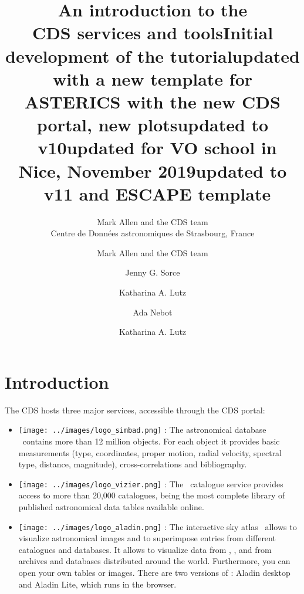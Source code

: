 \documentclass [a4paper, 12pt]{article}
\begin{document}
\author{Mark Allen and the CDS team \\      %
Centre de Donn\'ees astronomiques de Strasbourg, France}       %
\title{An introduction to the \\ CDS services and tools}   %
\makeescapetitle

\newpage
\author{Mark Allen and the CDS team}   %
\title{Initial development of the tutorial}  %
\addescapehistory
\author{Jenny G. Sorce}
\title{updated with a new template for ASTERICS with the new CDS portal, new plots}
\addescapehistory
\author{Katharina A. Lutz}
\title{updated to \aladin\ v10}
\addescapehistory
\author{Ada Nebot}
\title{updated for VO school in Nice, November 2019}
\addescapehistory
\author{Katharina A. Lutz}
\title{updated to \aladin\ v11 and ESCAPE template}
\addescapehistory
\newpage
\tableofcontents

\newpage
\section{Introduction}

The CDS hosts three major services, accessible through the CDS portal:\\
\begin{itemize}
\item \texttt{[image: ../images/logo\_simbad.png]}
\textbf{\simbad}: The astronomical database \simbad\ contains more than
12 million objects. For each object it provides basic measurements (type,
coordinates, proper motion, radial velocity, spectral type, distance,
magnitude), cross-correlations and bibliography.
\item \texttt{[image: ../images/logo\_vizier.png]}
\textbf{\vizier}: The \vizier\ catalogue service provides access to more than
20,000 catalogues, being the most complete library of published astronomical
data tables available online.
\item \texttt{[image: ../images/logo\_aladin.png]}
\textbf{\aladin}: The interactive sky atlas \aladin\ allows to
visualize astronomical images and to superimpose entries from different
catalogues and databases. It allows to visualize data from \simbad, \vizier, and
from archives and databases distributed around the world. Furthermore, you can
open your own tables or images. There are two versions of \aladin: Aladin desktop and Aladin
Lite, which runs in the browser.
\end{itemize}
\end{document}
